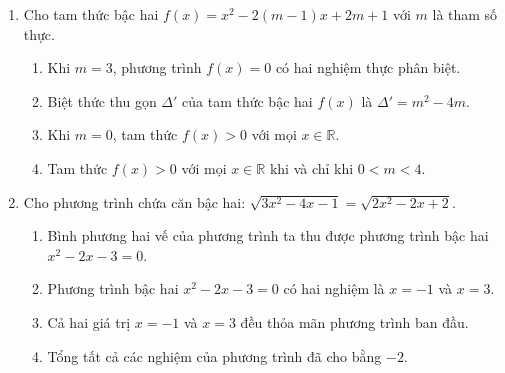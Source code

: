 \documentclass[10pt,a4paper]{article}
\begin{document}
\begin{enumerate}
\item Cho tam thức bậc hai $f(x) = x^2 - 2(m - 1)x + 2m + 1$ với $m$ là tham số thực.
\begin{enumerate}
    \item Khi $m = 3$, phương trình $f(x) = 0$ có hai nghiệm thực phân biệt.
    \item Biệt thức thu gọn $\Delta'$ của tam thức bậc hai $f(x)$ là $\Delta' = m^2 - 4m$.
    \item Khi $m = 0$, tam thức $f(x) > 0$ với mọi $x \in \mathbb{R}$.
    \item Tam thức $f(x) > 0$ với mọi $x \in \mathbb{R}$ khi và chỉ khi $0 < m < 4$.
\end{enumerate}

\item Cho phương trình chứa căn bậc hai: $\sqrt{3x^2 - 4x - 1} = \sqrt{2x^2 - 2x + 2}$.
\begin{enumerate}
    \item Bình phương hai vế của phương trình ta thu được phương trình bậc hai $x^2 - 2x - 3 = 0$.
    \item Phương trình bậc hai $x^2 - 2x - 3 = 0$ có hai nghiệm là $x = -1$ và $x = 3$.
    \item Cả hai giá trị $x = -1$ và $x = 3$ đều thỏa mãn phương trình ban đầu.
    \item Tổng tất cả các nghiệm của phương trình đã cho bằng $-2$.
\end{enumerate}
\end{enumerate}
\end{document}

